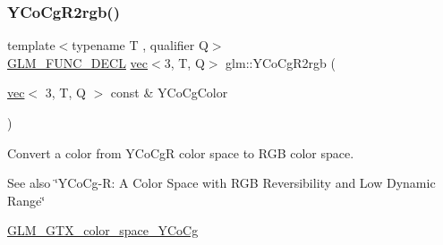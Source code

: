 \subsubsection{\texorpdfstring{Y\+Co\+Cg\+R2rgb()}{YCoCgR2rgb()}}
{\footnotesize\ttfamily template$<$typename T , qualifier Q$>$ \\
\hyperlink{setup_8hpp_ab2d052de21a70539923e9bcbf6e83a51}{G\+L\+M\+\_\+\+F\+U\+N\+C\+\_\+\+D\+E\+CL} \hyperlink{structglm_1_1vec}{vec}$<$3, T, Q$>$ glm\+::\+Y\+Co\+Cg\+R2rgb (\begin{DoxyParamCaption}\item[{\hyperlink{structglm_1_1vec}{vec}$<$ 3, T, Q $>$ const \&}]{Y\+Co\+Cg\+Color }\end{DoxyParamCaption})}

Convert a color from Y\+Co\+CgR color space to R\+GB color space. \begin{DoxySeeAlso}{See also}
\char`\"{}\+Y\+Co\+Cg-\/\+R\+: A Color Space with R\+G\+B Reversibility and Low Dynamic Range\char`\"{} 

\hyperlink{group__gtx__color__space___y_co_cg}{G\+L\+M\+\_\+\+G\+T\+X\+\_\+color\+\_\+space\+\_\+\+Y\+Co\+Cg} 
\end{DoxySeeAlso}
